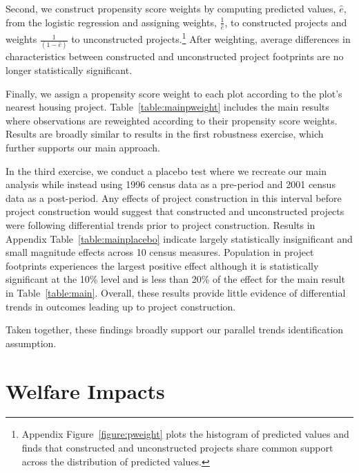 \documentclass[12pt]{article}
\begin{document}
Second, we construct propensity score weights by computing predicted values, $\hat{e}$, from the logistic regression and assigning weights, $\frac{1}{\hat{e}}$, to constructed projects and weights $\frac{1}{(1-\hat{e})}$ to unconstructed projects.\footnote{Appendix Figure~\ref{figure:pweight} plots the histogram of predicted values and finds that constructed and unconstructed projects share common support across the distribution of predicted values.}  After weighting, average differences in characteristics between constructed and unconstructed project footprints are no longer statistically significant.

Finally, we assign a propensity score weight to each plot according to the plot's nearest housing project.  Table~\ref{table:mainpweight} includes the main results where observations are reweighted according to their propensity score weights.  Results are broadly similar to results in the first robustness exercise, which further supports our main approach.

In the third exercise, we conduct a placebo test where we recreate our main analysis while instead using 1996 census data as a pre-period and 2001 census data as a post-period.  Any effects of project construction in this interval before project construction would suggest that constructed and unconstructed projects were following differential trends prior to project construction.  Results in Appendix Table~\ref{table:mainplacebo} indicate largely statistically insignificant and small magnitude effects across 10 census measures.  Population in project footprints experiences the largest positive effect although it is statistically significant at the 10\% level and is less than 20\% of the effect for the main result in Table~\ref{table:main}.  Overall, these results provide little evidence of differential trends in outcomes leading up to project construction.

Taken together, these findings broadly support our parallel trends identification assumption.


\section{Welfare Impacts}\label{section:theory}


\end{document}
